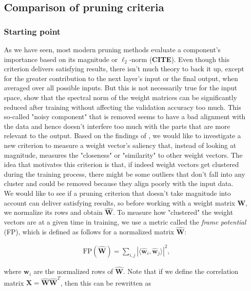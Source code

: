 \subsection{Comparison of pruning criteria}

\subsubsection*{Starting point}
As we have seen, most modern pruning methods evaluate a component's importance based on its magnitude or $\ell_2$-norm (\textbf{CITE}). Even though this criterion delivers satisfying results, there isn't much theory to back it up, except for the greater contribution to the next layer's input or the final output, when averaged over all possible inputs. But this is not necessarily true for the input space, \cite{nagarajan2019uniform} show that the spectral norm of the weight matrices can be significantly reduced after training without affecting the validation accuracy too much. This so-called "noisy component" that is removed seems to have a bad alignment with the data and hence doesn't interfere too much with the parts that are more relevant to the output. Based on the findings of \cite{brutzkus2019larger}, we would like to investigate a new criterion to measure a weight vector's saliency that, instead of looking at magnitude, measures the "closeness" or "similarity" to other weight vectors. The idea that motivates this criterion is that, if indeed weight vectors get clustered during the training process, there might be some outliers that don't fall into any cluster and could be removed because they align poorly with the input data. \\

We would like to see if a pruning criterion that doesn't take magnitude into account can deliver satisfying results, so before working with a weight matrix $\mathbf{W}$, we normalize its rows and obtain $\hat{\mathbf{W}}$. To measure how "clustered" the weight vectors are at a given time in training, we use a metric called the \textit{frame potential} (FP), which is defined as follows for a normalized matrix $\hat{\mathbf{W}}$:

\begin{align*}
\text{FP}(\hat{\mathbf{W}}) = \sum\limits_{i,j} |\langle \hat{\mathbf{w}}_i, \hat{\mathbf{w}}_j \rangle|^2,
\end{align*}

where $\mathbf{w}_i$ are the normalized rows of $\hat{\mathbf{W}}$. Note that if we define the correlation matrix $\mathbf{X} =  \hat{\mathbf{W}}\hat{\mathbf{W}}^T$, then this can be rewritten as

